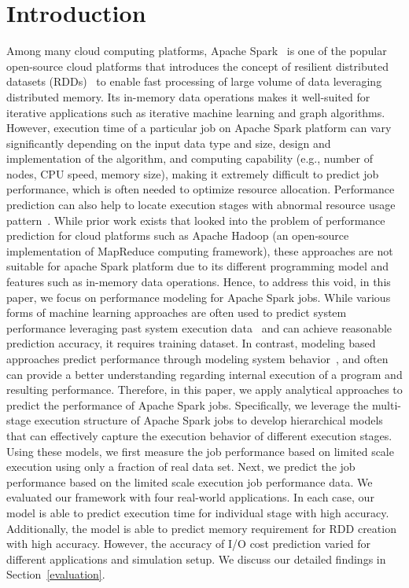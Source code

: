 \section{Introduction}
\noindent
Among many cloud computing platforms, Apache Spark~\cite{spark} is one of the popular open-source cloud platforms that introduces the concept of resilient distributed datasets (RDDs)~\cite{rdd} to enable fast processing of large volume of data leveraging distributed memory. Its in-memory data operations makes it well-suited for iterative applications such as iterative machine learning and graph algorithms. However, execution time of a particular job on Apache Spark platform can vary significantly depending on the input data type and size, design and implementation of the algorithm, and computing capability (e.g., number of nodes, CPU speed, memory size), making it extremely difficult to predict job performance, which is often needed to optimize resource allocation\cite{cloudopt}\cite{cloudscale}. Performance prediction can also help to locate execution stages with abnormal resource usage pattern~\cite{prepare}. 
While prior work exists that looked into the problem of performance prediction for cloud platforms such as Apache Hadoop \cite{hadoop} (an open-source implementation of MapReduce \cite{mr} computing framework), these approaches are not suitable for apache Spark platform due to its different programming model and features such as in-memory data operations.
\noindent
Hence, to address this void, in this paper, we focus on performance modeling for Apache Spark jobs. While various forms of machine learning approaches are often used to predict system performance leveraging past system execution data~\cite{stat}\cite{predict}\cite{oltp} and can achieve reasonable prediction accuracy, it requires training dataset. In contrast, modeling based approaches predict performance through modeling system behavior~\cite{starfish}\cite{nosqlmodel}\cite{pmodel}, and often can provide a better understanding regarding internal execution of a program and resulting performance. Therefore, in this paper, we apply analytical approaches to predict the performance of Apache Spark jobs. Specifically, we leverage the multi-stage execution structure of Apache Spark jobs to develop hierarchical models that can effectively capture the execution behavior of different execution stages. Using these models, we first measure the job performance based on limited scale execution using only a fraction of real data set. Next, we predict the job performance based on the limited scale execution job performance data. We evaluated our framework with four real-world applications. In each case, our model is able to predict execution time for individual stage with high accuracy. Additionally, the model is able to predict memory requirement for RDD creation with high accuracy. However, the accuracy of I/O cost prediction varied for different applications and simulation setup. We discuss our detailed findings in Section~\ref{evaluation}.

